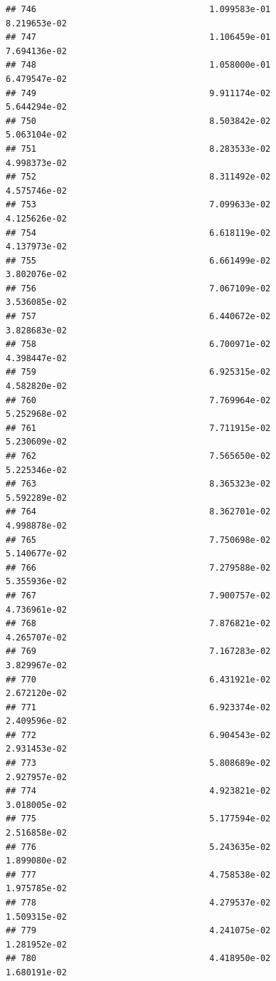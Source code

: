 \documentclass[
]{article}
\begin{document}
\begin{verbatim}
## 746                                  1.099583e-01           8.219653e-02
## 747                                  1.106459e-01           7.694136e-02
## 748                                  1.058000e-01           6.479547e-02
## 749                                  9.911174e-02           5.644294e-02
## 750                                  8.503842e-02           5.063104e-02
## 751                                  8.283533e-02           4.998373e-02
## 752                                  8.311492e-02           4.575746e-02
## 753                                  7.099633e-02           4.125626e-02
## 754                                  6.618119e-02           4.137973e-02
## 755                                  6.661499e-02           3.802076e-02
## 756                                  7.067109e-02           3.536085e-02
## 757                                  6.440672e-02           3.828683e-02
## 758                                  6.700971e-02           4.398447e-02
## 759                                  6.925315e-02           4.582820e-02
## 760                                  7.769964e-02           5.252968e-02
## 761                                  7.711915e-02           5.230609e-02
## 762                                  7.565650e-02           5.225346e-02
## 763                                  8.365323e-02           5.592289e-02
## 764                                  8.362701e-02           4.998878e-02
## 765                                  7.750698e-02           5.140677e-02
## 766                                  7.279588e-02           5.355936e-02
## 767                                  7.900757e-02           4.736961e-02
## 768                                  7.876821e-02           4.265707e-02
## 769                                  7.167283e-02           3.829967e-02
## 770                                  6.431921e-02           2.672120e-02
## 771                                  6.923374e-02           2.409596e-02
## 772                                  6.904543e-02           2.931453e-02
## 773                                  5.808689e-02           2.927957e-02
## 774                                  4.923821e-02           3.018005e-02
## 775                                  5.177594e-02           2.516858e-02
## 776                                  5.243635e-02           1.899080e-02
## 777                                  4.758538e-02           1.975785e-02
## 778                                  4.279537e-02           1.509315e-02
## 779                                  4.241075e-02           1.281952e-02
## 780                                  4.418950e-02           1.680191e-02

\end{verbatim}
\end{document}
